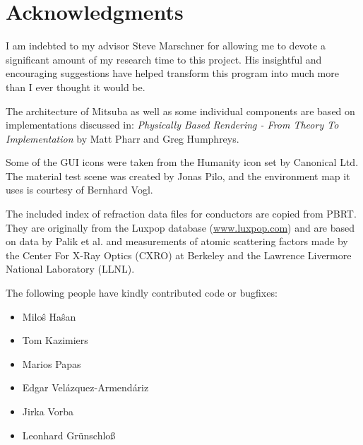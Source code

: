 \section{Acknowledgments}
I am indebted to my advisor Steve Marschner for allowing me to devote
a significant amount of my research time to this project. His insightful and 
encouraging suggestions have helped transform this program into much more than
I ever thought it would be.

The architecture of Mitsuba as well as some individual components are based on 
implementations discussed in: \emph{Physically Based Rendering - From Theory 
To Implementation} by Matt Pharr and Greg Humphreys.

Some of the GUI icons were taken from the Humanity icon set by Canonical Ltd.
The material test scene was created by Jonas Pilo, and the environment map
it uses is courtesy of Bernhard Vogl.

The included index of refraction data files for conductors are copied from
PBRT. They are originally from the Luxpop database (\url{www.luxpop.com}) 
and are based on data by Palik et al. \cite{Palik1998Handbook}
and measurements of atomic scattering factors made by the Center For
X-Ray Optics (CXRO) at Berkeley and the Lawrence Livermore National 
Laboratory (LLNL).

The following people have kindly contributed code or bugfixes:
\begin{itemize}
\item Milo\^{s} Ha\^{s}an
\item Tom Kazimiers
\item Marios Papas
\item Edgar Vel\'{a}zquez-Armend\'{a}riz
\item Jirka Vorba
\item Leonhard Gr\"unschlo\ss
\end{itemize}

